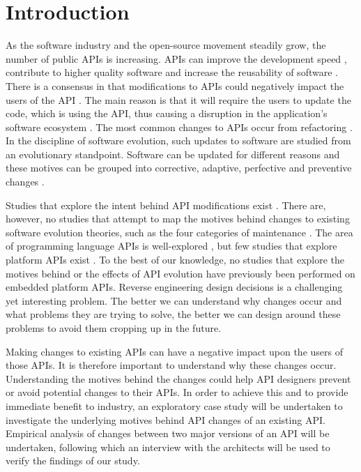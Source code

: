 \documentclass{sig-alternate}
\begin{document}
\section{Introduction} \label{introduction}
As the software industry and the open-source movement steadily grow, the number of public APIs is increasing. APIs can improve the development speed \cite{stylos2006comparing}, contribute to higher quality software \cite{stylos2006comparing} and increase the reusability of software \cite{afonso2012evaluating}. There is a consensus in that modifications to APIs could negatively impact the users of the API \cite{google_talk} \cite{mcdonnell2013empirical} \cite{robbes2012developers} \cite{henning2007api}. The main reason is that it will require the users to update the code, which is using the API, thus causing a disruption in the application's software ecosystem \cite{messerschmitt2005software}. The most common changes to APIs occur from refactoring \cite{dig2005role} \cite{xing2006refactoring}. 
In the discipline of software evolution, such updates to software are studied from an evolutionary standpoint. Software can be updated for different reasons and these motives can be grouped into corrective, adaptive, perfective and preventive changes \cite{lientz1980software}. 

Studies that explore the intent behind API modifications exist \cite{hou2011exploring}. There are, however, no studies that attempt to map the motives behind changes to existing software evolution theories, such as the four categories of maintenance \cite{lientz1980software}. The area of programming language APIs is well-explored \cite{hou2011exploring} \cite{shi2011empirical}, but few studies that explore platform APIs exist \cite{robbes2012developers}. To the best of our knowledge, no studies that explore the motives behind or the effects of API evolution have previously been performed on embedded platform APIs. Reverse engineering design decisions is a challenging yet interesting problem. The better we can understand why changes occur and what problems they are trying to solve, the better we can design around these problems to avoid them cropping up in the future.


Making changes to existing APIs can have a negative impact upon the users of those APIs. It is therefore important to understand why these changes occur. Understanding the motives behind the changes could help API designers prevent or avoid potential changes to their APIs. In order to achieve this and to provide immediate benefit to industry, an exploratory case study will be undertaken to investigate the underlying motives behind API changes of an existing API. Empirical analysis of changes between two major versions of an API will be undertaken, following which an interview with the architects will be used to verify the findings of our study. 
\end{document}
